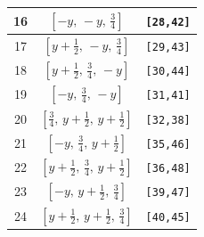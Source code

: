 \documentclass[fleqn,8pt]{jsarticle}
\begin{document}
\begin{longtable}{ccc}
16 & $\left[ - y,\, - y,\, \frac{3}{4} \right]$ & {\tt [28,42]} \\ \hline
17 & $\left[ y + \frac{1}{2},\, - y,\, \frac{3}{4} \right]$ & {\tt [29,43]} \\ \hline
18 & $\left[ y + \frac{1}{2},\, \frac{3}{4},\, - y \right]$ & {\tt [30,44]} \\ \hline
19 & $\left[ - y,\, \frac{3}{4},\, - y \right]$ & {\tt [31,41]} \\ \hline
20 & $\left[ \frac{3}{4},\, y + \frac{1}{2},\, y + \frac{1}{2} \right]$ & {\tt [32,38]} \\ \hline
21 & $\left[ - y,\, \frac{3}{4},\, y + \frac{1}{2} \right]$ & {\tt [35,46]} \\ \hline
22 & $\left[ y + \frac{1}{2},\, \frac{3}{4},\, y + \frac{1}{2} \right]$ & {\tt [36,48]} \\ \hline
23 & $\left[ - y,\, y + \frac{1}{2},\, \frac{3}{4} \right]$ & {\tt [39,47]} \\ \hline
24 & $\left[ y + \frac{1}{2},\, y + \frac{1}{2},\, \frac{3}{4} \right]$ & {\tt [40,45]} \\
\end{longtable}
\renewcommand{\arraystretch}{1.2}
\end{document}
